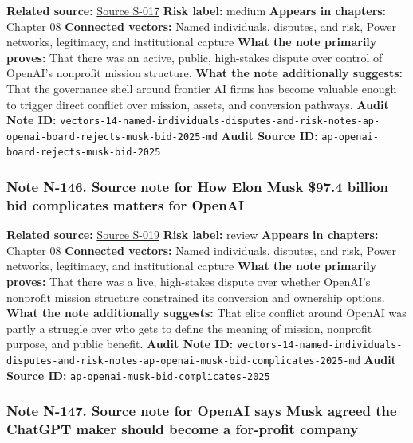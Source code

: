 \documentclass[
  american,
  11pt,
  letterpaper,
]{article}
\begin{document}
\textbf{Related source:}
\hyperref[source-s-017-openai-board-unanimously-rejects-elon-musk-s-97-4-billion-proposal]{Source
S-017} \textbf{Risk label:} medium \textbf{Appears in chapters:} Chapter
08 \textbf{Connected vectors:} Named individuals, disputes, and risk,
Power networks, legitimacy, and institutional capture \textbf{What the
note primarily proves:} That there was an active, public, high-stakes
dispute over control of OpenAI's nonprofit mission structure.
\textbf{What the note additionally suggests:} That the governance shell
around frontier AI firms has become valuable enough to trigger direct
conflict over mission, assets, and conversion pathways. \textbf{Audit
Note ID:}
\texttt{vectors-14-named-individuals-disputes-and-risk-notes-ap-openai-board-rejects-musk-bid-2025-md}
\textbf{Audit Source ID:} \texttt{ap-openai-board-rejects-musk-bid-2025}

\subsubsection{Note N-146. Source note for How Elon Musk \$97.4 billion
bid complicates matters for
OpenAI}\label{note-n-146-vectors-14-named-individuals-disputes-and-risk-notes-ap-openai-musk-bid-complicates-2025-md}

\textbf{Related source:}
\hyperref[source-s-019-how-elon-musk-97-4-billion-bid-complicates-matters-for-openai]{Source
S-019} \textbf{Risk label:} review \textbf{Appears in chapters:} Chapter
08 \textbf{Connected vectors:} Named individuals, disputes, and risk,
Power networks, legitimacy, and institutional capture \textbf{What the
note primarily proves:} That there was a live, high-stakes dispute over
whether OpenAI's nonprofit mission structure constrained its conversion
and ownership options. \textbf{What the note additionally suggests:}
That elite conflict around OpenAI was partly a struggle over who gets to
define the meaning of mission, nonprofit purpose, and public benefit.
\textbf{Audit Note ID:}
\texttt{vectors-14-named-individuals-disputes-and-risk-notes-ap-openai-musk-bid-complicates-2025-md}
\textbf{Audit Source ID:} \texttt{ap-openai-musk-bid-complicates-2025}

\subsubsection{Note N-147. Source note for OpenAI says Musk agreed the
ChatGPT maker should become a for-profit
company}\label{note-n-147-vectors-14-named-individuals-disputes-and-risk-notes-ap-openai-musk-for-profit-2024-md}
\end{document}
